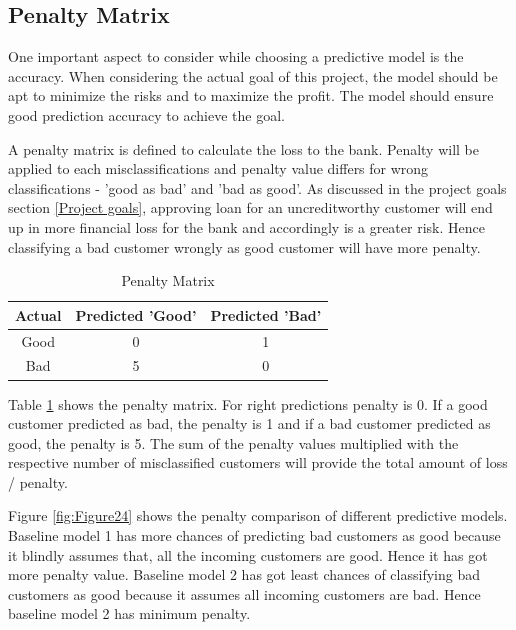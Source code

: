 \documentclass[sigconf]{acmart}
\begin{document}
\subsection{Penalty Matrix} 

One important aspect to consider while choosing a predictive model is the accuracy. When considering the actual goal of this project, the model should be apt to minimize the risks and to maximize the profit. The model should ensure good prediction accuracy to achieve the goal. 

A penalty matrix is defined to calculate the loss to the bank. Penalty will be applied to each misclassifications and penalty value differs for wrong classifications - 'good as bad' and 'bad as good'. As discussed in the project goals section \ref{Project goals}, approving loan for an uncreditworthy customer will end up in more financial loss for the bank and accordingly is a greater risk. Hence classifying a bad customer wrongly as good customer will have more penalty.  

\begin{table}
  \caption{Penalty Matrix
  \cite{psu-site}}
  \label{tab:table4}
  \begin{tabular}{ccc}
    \toprule
     Actual& Predicted 'Good'& Predicted 'Bad'\\
    \midrule
    Good& 0& 1\\
    Bad& 5& 0\\
    \bottomrule
  \end{tabular}
\end{table}

Table \ref{tab:table4} shows the penalty matrix. For right predictions penalty is 0. If a good customer predicted as bad, the penalty is 1 and if a bad customer predicted as good, the penalty is 5. The sum of the penalty values multiplied with the respective number of misclassified customers will provide the total amount of loss / penalty.

Figure \ref{fig:Figure24} shows the penalty comparison of different predictive models. Baseline model 1 has more chances of predicting bad customers as good because it blindly assumes that, all the incoming customers are good. Hence it has got more penalty value. Baseline model 2 has got least chances of classifying bad customers as good because it assumes all incoming customers are bad. Hence baseline model 2 has minimum penalty. 
\end{document}
